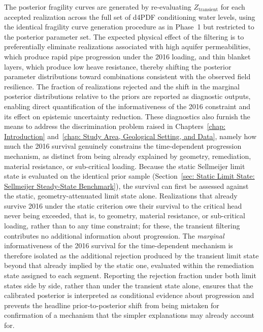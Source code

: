 The posterior fragility curves are generated by re-evaluating $Z_\mathrm{transient}$ for each accepted realization across the full set of d4PDF conditioning water levels, using the identical fragility curve generation procedure as in Phase~1 but restricted to the posterior parameter set. The expected physical effect of the filtering is to preferentially eliminate realizations associated with high aquifer permeabilities, which produce rapid pipe progression under the 2016 loading, and thin blanket layers, which produce low heave resistance, thereby shifting the posterior parameter distributions toward combinations consistent with the observed field resilience. The fraction of realizations rejected and the shift in the marginal posterior distributions relative to the priors are reported as diagnostic outputs, enabling direct quantification of the informativeness of the 2016 constraint and its effect on epistemic uncertainty reduction. These diagnostics also furnish the means to address the discrimination problem raised in Chapters~\ref{chap: Introduction} and~\ref{chap: Study Area, Geological Setting, and Data}, namely how much the 2016 survival genuinely constrains the time-dependent progression mechanism, as distinct from being already explained by geometry, remediation, material resistance, or sub-critical loading. Because the static Sellmeijer limit state is evaluated on the identical prior sample (Section~\ref{sec: Static Limit State: Sellmeijer Steady-State Benchmark}), the survival can first be assessed against the static, geometry-attenuated limit state alone. Realizations that already survive 2016 under the static criterion owe their survival to the critical head never being exceeded, that is, to geometry, material resistance, or sub-critical loading, rather than to any time constraint; for these, the transient filtering contributes no additional information about progression. The \emph{marginal} informativeness of the 2016 survival for the time-dependent mechanism is therefore isolated as the additional rejection produced by the transient limit state beyond that already implied by the static one, evaluated within the remediation state assigned to each segment. Reporting the rejection fraction under both limit states side by side, rather than under the transient state alone, ensures that the calibrated posterior is interpreted as conditional evidence about progression and prevents the headline prior-to-posterior shift from being mistaken for confirmation of a mechanism that the simpler explanations may already account for.

